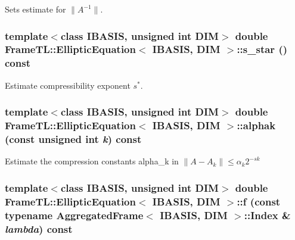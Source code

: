 Sets estimate for $\|A^{-1}\|$. \hypertarget{classFrameTL_1_1EllipticEquation_49aa28d722e5828e9ddf9d1bd57bff78}{
\subsubsection[s\_\-star]{\setlength{\rightskip}{0pt plus 5cm}template$<$class IBASIS, unsigned int DIM$>$ double {\bf FrameTL::EllipticEquation}$<$ IBASIS, DIM $>$::s\_\-star () const}}
\label{classFrameTL_1_1EllipticEquation_49aa28d722e5828e9ddf9d1bd57bff78}


Estimate compressibility exponent $s^\ast$. \hypertarget{classFrameTL_1_1EllipticEquation_0ec35809bbfccc2dfff23d6efbee6a92}{
\subsubsection[alphak]{\setlength{\rightskip}{0pt plus 5cm}template$<$class IBASIS, unsigned int DIM$>$ double {\bf FrameTL::EllipticEquation}$<$ IBASIS, DIM $>$::alphak (const unsigned int {\em k}) const}}
\label{classFrameTL_1_1EllipticEquation_0ec35809bbfccc2dfff23d6efbee6a92}


Estimate the compression constants alpha\_\-k in $\|A-A_k\| \leq \alpha_k 2^{-sk}$ \hypertarget{classFrameTL_1_1EllipticEquation_cf749ff770cf529266c1272bca4bc184}{
\subsubsection[f]{\setlength{\rightskip}{0pt plus 5cm}template$<$class IBASIS, unsigned int DIM$>$ double {\bf FrameTL::EllipticEquation}$<$ IBASIS, DIM $>$::f (const typename {\bf AggregatedFrame}$<$ IBASIS, DIM $>$::{\bf Index} \& {\em lambda}) const}}
\label{classFrameTL_1_1EllipticEquation_cf749ff770cf529266c1272bca4bc184}


